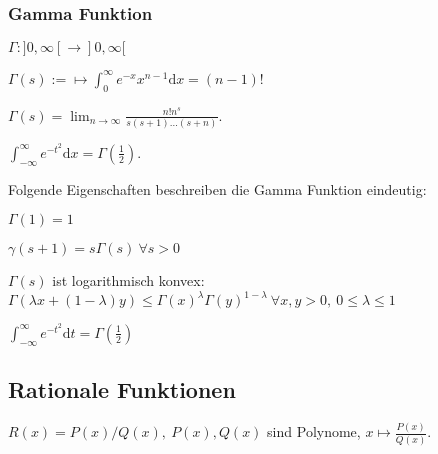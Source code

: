\subsubsection{Gamma Funktion}
\begin{compactitem}
    \item $\Gamma: ]0, \infty[ \to ]0, \infty[$
    \item $\Gamma(s) := \mapsto \int_{0}^{\infty} e^{-x}x^{n-1} \mathrm{d}x = (n-1)!$
    \item $\Gamma(s) = \lim_{n \to \infty} \frac{n!n^s}{s(s+1)\dots (s+n)}$.
    \item $\int_{-\infty}^{\infty} e^{-t^2}\mathrm{d}x = \Gamma(\frac{1}{2})$.
\end{compactitem}

Folgende Eigenschaften beschreiben die Gamma Funktion eindeutig:
\begin{inparaenum}
    \item $\Gamma(1) = 1$
    \item $\gamma(s + 1) = s \Gamma(s) \ \forall s > 0$
    \item $\Gamma(s)$ ist logarithmisch konvex: $\Gamma(\lambda x + (1- \lambda)y) \le \Gamma(x)^\lambda \Gamma(y)^{1-\lambda} \ \forall x,y > 0, \ 0 \le \lambda \le 1$
\end{inparaenum}
\begin{compactitem}
    \item $\int_{-\infty}^{\infty} e^{-t^2}\mathrm{d}t = \Gamma(\frac{1}{2})$
\end{compactitem}

\subsection{Rationale Funktionen}
$R(x) = P(x) / Q(x), \ P(x), Q(x)$ sind Polynome, $x \mapsto \frac{P(x)}{Q(x)}$.
\begin{compactitem}
    \item
\end{compactitem}

